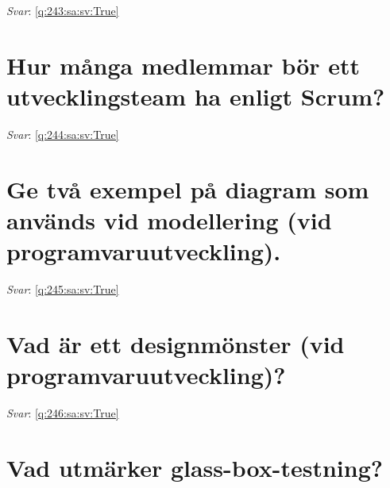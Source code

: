 \documentclass[a4paper,11pt,oneside]{book}
\begin{document}
\begin{sloppypar}
\noindent\makebox[\textwidth]{\hrulefill}

\vspace{1cm}

\textit{Svar}: \autoref{q:243:sa:sv:True}



\section{Hur m\r{a}nga medlemmar b\"or ett utvecklingsteam ha enligt Scrum?}

\label{q:244:sa:sv:False}

\vspace{2cm}

\noindent\makebox[\textwidth]{\hrulefill}

\vspace{1cm}

\textit{Svar}: \autoref{q:244:sa:sv:True}



\section{Ge tv\r{a} exempel p\r{a} diagram som anv\"ands vid modellering (vid programvaruutveckling).}

\label{q:245:sa:sv:False}

\vspace{2cm}

\noindent\makebox[\textwidth]{\hrulefill}

\vspace{1cm}

\textit{Svar}: \autoref{q:245:sa:sv:True}



\section{Vad \"ar ett designm\"onster (vid programvaruutveckling)?}

\label{q:246:sa:sv:False}

\vspace{2cm}

\noindent\makebox[\textwidth]{\hrulefill}

\vspace{1cm}

\textit{Svar}: \autoref{q:246:sa:sv:True}



\section{Vad utm\"arker glass-box-testning?}


\end{sloppypar}
\end{document}
